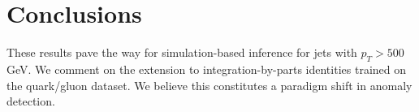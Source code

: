 \section{Conclusions}\label{sec:conclusions}

These results pave the way for simulation-based inference for jets with
$p_T > 500$ GeV. We comment on the extension to integration-by-parts
identities trained on the quark/gluon dataset. We believe this
constitutes a paradigm shift in anomaly detection.

